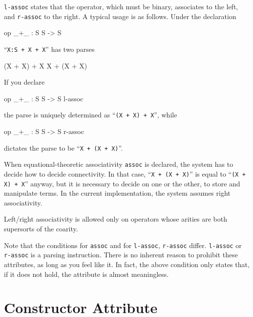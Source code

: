 \documentclass[a4paper]{memoir}
\begin{document}
\verb|l-assoc| states that the operator, which must be binary,
associates to the left, and \verb|r-assoc| to the right. A
typical usage is as follows. Under the declaration
\begin{vvtm}
\begin{ccode}
  op _+_ : S S -> S
\end{ccode}
\end{vvtm}
``\verb|X:S + X + X|'' has two parses
\begin{vvtm}
\begin{ccode}
  (X + X) + X
  X + (X + X)
\end{ccode}
\end{vvtm}
If you declare
\begin{vvtm}
\begin{ccode}
   op _+_ : S S -> S { l-assoc }
\end{ccode}
\end{vvtm}
the parse is uniquely determined as ``\verb|(X + X) + X|'', while
\begin{vvtm}
\begin{ccode}
   op _+_ : S S -> S { r-assoc }
\end{ccode}
\end{vvtm}
dictates the parse to be ``\verb|X + (X + X)|''.

\begin{warning}
When equational-theoretic associativity \verb|assoc|
is declared,
the system has to decide how to decide connectivity. In that case,
``\verb|X + (X + X)|'' is equal to ``\verb|(X + X) + X|'' anyway, but
it is necessary to decide on one or the other,
to store and manipulate terms. In the current implementation,
the system assumes right associativity.
\end{warning}

Left/right associativity is allowed only on operators whose
arities are both supersorts of the coarity.

\begin{warning}
  Note that the conditions for \verb|assoc| and for \verb|l-assoc|,
  \verb|r-assoc| differ. \verb|l-assoc| or \verb|r-assoc| is a
  parsing instruction. There is no inherent reason to
  prohibit these attributes, as long as you feel like it.
  In fact, the above condition only states that, if it does not
  hold, the attribute is almost meaningless.
\end{warning}

\section{Constructor Attribute}\label{sec:p2-constructor-attribute}
\end{document}

